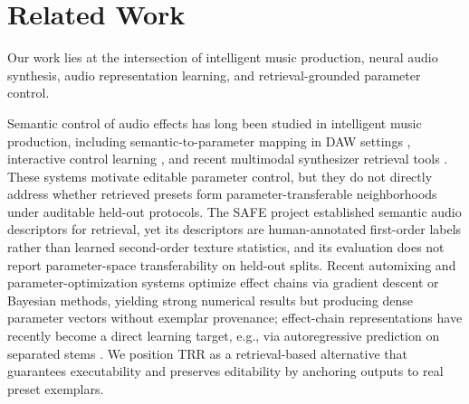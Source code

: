 \section{Related Work}
\label{sec:related_work}

Our work lies at the intersection of intelligent music production, neural audio synthesis, audio representation learning, and retrieval-grounded parameter control.

Semantic control of audio effects has long been studied in intelligent music production, including semantic-to-parameter mapping in DAW settings \citep{stables2014semantic}, interactive control learning \citep{huang2014active}, and recent multimodal synthesizer retrieval tools \citep{bryan2024synthscribe}. These systems motivate editable parameter control, but they do not directly address whether retrieved presets form parameter-transferable neighborhoods under auditable held-out protocols. The SAFE project \citep{stables2014semantic} established semantic audio descriptors for retrieval, yet its descriptors are human-annotated first-order labels rather than learned second-order texture statistics, and its evaluation does not report parameter-space transferability on held-out splits. Recent automixing and parameter-optimization systems \citep{steinmetz2022automix,moliner2026generative,benetos2024stito} optimize effect chains via gradient descent or Bayesian methods, yielding strong numerical results but producing dense parameter vectors without exemplar provenance; effect-chain representations have recently become a direct learning target, e.g., via autoregressive prediction on separated stems \citep{cheng2026stemfx}. We position TRR as a retrieval-based alternative that guarantees executability and preserves editability by anchoring outputs to real preset exemplars.

